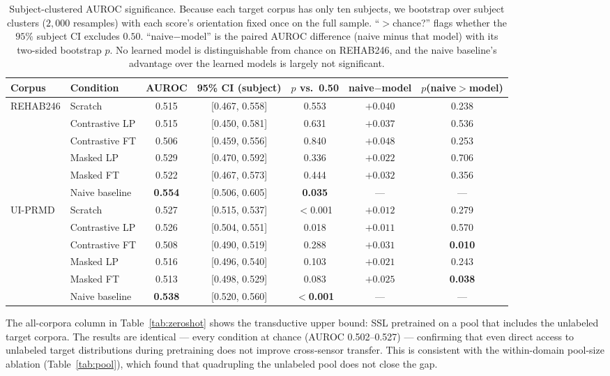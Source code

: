 \documentclass[10pt,journal]{IEEEtran}
\begin{document}
\begin{table}[t]
\centering
\footnotesize
\setlength{\tabcolsep}{4pt}
\caption{Subject-clustered AUROC significance. Because each target corpus has only ten subjects, we bootstrap over subject clusters ($2{,}000$ resamples) with each score's orientation fixed once on the full sample. ``$>$chance?'' flags whether the $95\%$ subject CI excludes $0.50$. ``naive$-$model'' is the paired AUROC difference (naive minus that model) with its two-sided bootstrap $p$. No learned model is distinguishable from chance on REHAB246, and the naive baseline's advantage over the learned models is largely not significant.}
\label{tab:auroc-sig}
\begin{tabular}{llccccc}
\toprule
Corpus & Condition & AUROC & 95\% CI (subject) & $p$ vs.\ 0.50 & naive$-$model & $p$(naive$>$model) \\
\midrule
\multirow{6}{*}{REHAB246}
 & Scratch        & 0.515 & [0.467, 0.558] & 0.553 & $+0.040$ & 0.238 \\
 & Contrastive LP & 0.515 & [0.450, 0.581] & 0.631 & $+0.037$ & 0.536 \\
 & Contrastive FT & 0.506 & [0.459, 0.556] & 0.840 & $+0.048$ & 0.253 \\
 & Masked LP      & 0.529 & [0.470, 0.592] & 0.336 & $+0.022$ & 0.706 \\
 & Masked FT      & 0.522 & [0.467, 0.573] & 0.444 & $+0.032$ & 0.356 \\
 & Naive baseline & \textbf{0.554} & [0.506, 0.605] & \textbf{0.035} & --- & --- \\
\midrule
\multirow{6}{*}{UI-PRMD}
 & Scratch        & 0.527 & [0.515, 0.537] & $<$0.001 & $+0.012$ & 0.279 \\
 & Contrastive LP & 0.526 & [0.504, 0.551] & 0.018 & $+0.011$ & 0.570 \\
 & Contrastive FT & 0.508 & [0.490, 0.519] & 0.288 & $+0.031$ & \textbf{0.010} \\
 & Masked LP      & 0.516 & [0.496, 0.540] & 0.103 & $+0.021$ & 0.243 \\
 & Masked FT      & 0.513 & [0.498, 0.529] & 0.083 & $+0.025$ & \textbf{0.038} \\
 & Naive baseline & \textbf{0.538} & [0.520, 0.560] & \textbf{$<$0.001} & --- & --- \\
\bottomrule
\end{tabular}
\end{table}

The all-corpora column in Table~\ref{tab:zeroshot} shows the transductive upper bound: SSL pretrained on a pool that includes the unlabeled target corpora. The results are identical --- every condition at chance (AUROC 0.502--0.527) --- confirming that even direct access to unlabeled target distributions during pretraining does not improve cross-sensor transfer. This is consistent with the within-domain pool-size ablation (Table~\ref{tab:pool}), which found that quadrupling the unlabeled pool does not close the gap.
\end{document}
